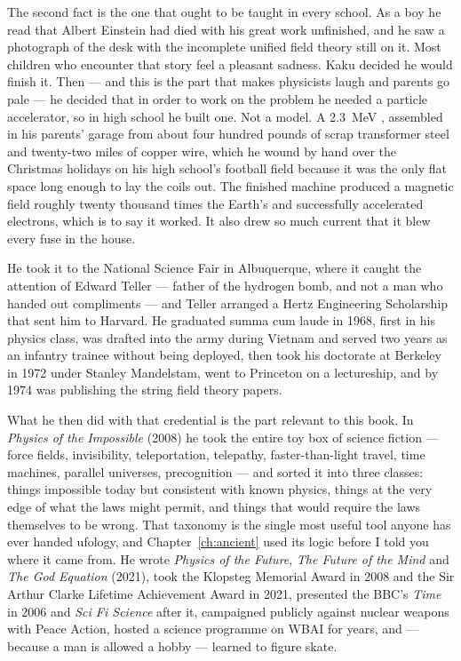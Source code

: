 The second fact is the one that ought to be taught in every school. As a boy he read that Albert
Einstein had died with his great work unfinished, and he saw a photograph of the desk with the
incomplete unified field theory still on it. Most children who encounter that story feel a
pleasant sadness. Kaku decided he would finish it. Then --- and this is the part that makes
physicists laugh and parents go pale --- he decided that in order to work on the problem he needed
a particle accelerator, so in high school he built one. Not a model. A 2.3~MeV ,
assembled in his parents' garage from about four hundred pounds of scrap transformer steel and
twenty-two miles of copper wire, which he wound by hand over the Christmas holidays on his high
school's football field because it was the only flat space long enough to lay the coils out.
The finished machine produced a magnetic field roughly twenty thousand times the Earth's and
successfully accelerated electrons, which is to say it worked. It also drew so much current that
it blew every fuse in the house. 

He took it to the National Science Fair in Albuquerque, where it caught the attention of Edward
Teller --- father of the hydrogen bomb, and not a man who handed out compliments --- and Teller
arranged a Hertz Engineering Scholarship that sent him to Harvard. He graduated summa cum laude
in 1968, first in his physics class, was drafted into the army during Vietnam and served two years
as an infantry trainee without being deployed, then took his doctorate at Berkeley in 1972 under
Stanley Mandelstam, went to Princeton on a lectureship, and by 1974 was publishing the string
field theory papers. 

What he then did with that credential is the part relevant to this book. In \emph{Physics of the
Impossible} (2008) he took the entire toy box of science fiction --- force fields, invisibility,
teleportation, telepathy, faster-than-light travel, time machines, parallel universes,
precognition --- and sorted it into three classes: things impossible today but consistent with
known physics, things at the very edge of what the laws might permit, and things that would
require the laws themselves to be wrong. That taxonomy is the single most useful tool anyone has
ever handed ufology, and Chapter~\ref{ch:ancient} used its logic before I told you where it came
from. He wrote \emph{Physics of the Future}, \emph{The Future of the Mind} and \emph{The God
Equation} (2021), took the Klopsteg Memorial Award in 2008 and the Sir Arthur Clarke Lifetime
Achievement Award in 2021, presented the BBC's \emph{Time} in 2006 and \emph{Sci Fi Science} after
it, campaigned publicly against nuclear weapons with Peace Action, hosted a science programme on
WBAI for years, and --- because a man is allowed a hobby --- learned to figure skate.

